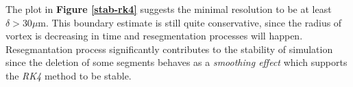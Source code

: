 The plot in \textbf{Figure \ref{stab-rk4}} suggests the minimal resolution to be at least $\delta >30\mu\text{m}$. This boundary estimate is still quite conservative, since the radius of vortex is decreasing in time and resegmentation processes will happen.
Resegmantation process significantly contributes to the stability of simulation since the deletion of some segments behaves as a \textit{smoothing effect} which supports the \textit{RK4} method to be stable.

\newpage
